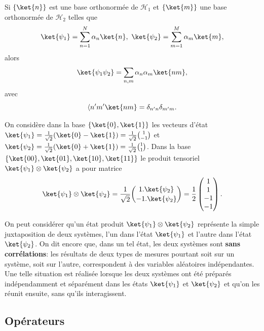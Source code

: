 Si $\{\ket{n}\}$ est une base orthonormée de $\mathcal{H}_{1}$ et $\{\ket{m}\}$
une base orthonormée de $\mathcal{H}_{2}$ telles que%
\begin{equation}
\ket{\psi_{1}}=\sum_{n=1}^{N}\alpha_{n}\ket{n},\ \ket{\psi_{2}}=\sum_{m=1}^{M}
\alpha_{m}\ket{m},
\end{equation}
alors%
\begin{equation}
\ket{\psi_{1}\psi_{2}}=\sum_{n,m}\alpha_{n}\alpha_{m}\ket{nm},
\label{eq:PT2}%
\end{equation}
avec%
\begin{equation}
\langle n^{\prime}m^{\prime}\ket{nm}=\delta_{n^{\prime}n}\delta_{m^{\prime}m}.
\end{equation}

\begin{example}\label{expl:tensoEt}
On considère dans la base $\{\ket{0},\ket{1}\}$ les vecteurs d'état
$\ket{\psi_1}=\frac{1}{\sqrt{2}}(\ket{0}-\ket{1})=
\frac{1}{\sqrt{2}}\binom{1}{-1}$ et
$\ket{\psi_{2}}=\frac{1}{\sqrt{2}}(\ket{0}+\ket{1})=\frac{1}{\sqrt{2}}
\binom{1}{1}$. Dans la base $\{\ket{00},\ket{01},\ket{10},\ket{11}\}$ le produit
tensoriel $\ket{\psi_{1}}\otimes\ket{\psi_{2}}$ a pour matrice%
\begin{equation}
\ket{\psi_{1}}\otimes\ket{\psi_{2}}=\frac{1}{\sqrt{2}}\binom{1.\ket{\psi_{2}}}{
-1.\ket{\psi_{2}}}=\frac{1}{2}\begin{pmatrix}
1\\
1\\
-1\\
-1
\end{pmatrix}.
\end{equation}

\end{example}

On peut considérer qu'un état produit $\ket{\psi_{1}} \otimes\ket{\psi_{2}}$
représente la simple juxtaposition de deux systèmes, l'un dans l'état
$\ket{\psi_{1}}$ et l'autre dans l'état $\ket{\psi_{2}}$. On dit encore que,
dans un tel état, les deux systèmes sont \textbf{sans corrélations}: les
résultats de deux types de mesures pourtant soit sur un système, soit sur
l'autre, correspondent à des variables aléatoires indépendantes. Une telle
situation est réalisée lorsque les deux systèmes ont été préparés indépendamment
et séparément dans les états $\ket{\psi_{1}}$ et $\ket{\psi_{2}}$ et qu'on les
réunit ensuite, sans qu'ils interagissent.

\subsection{Opérateurs}

